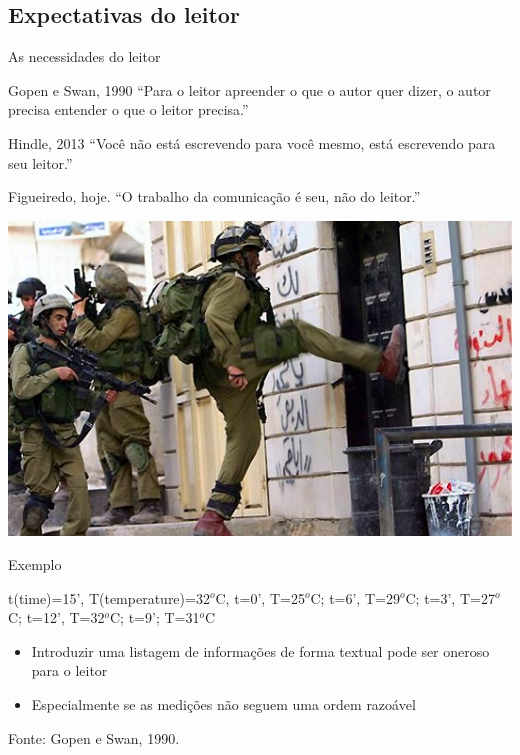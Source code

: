 \documentclass{beamer}
\begin{document}
\subsection{Expectativas do leitor}

\begin{frame}{As necessidades do leitor}
  \begin{block}{Gopen e Swan, 1990}
    ``Para o leitor apreender o que o autor quer dizer, o autor
    precisa entender o que o leitor precisa.''
  \end{block}
  \begin{block}{Hindle, 2013}
    ``Você não está escrevendo para você mesmo, está escrevendo para
    seu leitor.''
  \end{block}
  \begin{block}{Figueiredo, hoje.}
    ``O \alert{trabalho} da comunicação é seu, não do leitor.''
  \end{block}
\end{frame}

\begin{frame}
  \includegraphics[width=\textwidth]{Escrita/penaporta}
\end{frame}
\begin{frame}{Exemplo}
  \begin{example}
    t(time)=15', T(temperature)=32$^o$C, t=0', T=25$^o$C; t=6',
    T=29$^o$C; t=3', T=27$^o$C; t=12', T=32$^o$C; t=9'; T=31$^o$C
  \end{example}

  \begin{itemize}
  \item Introduzir uma listagem de informações de forma textual pode
    ser oneroso para o leitor
  \item Especialmente se as medições não seguem uma ordem razoável
  \end{itemize}
\vfill
  Fonte: Gopen e Swan, 1990.
\end{frame}
\end{document}
